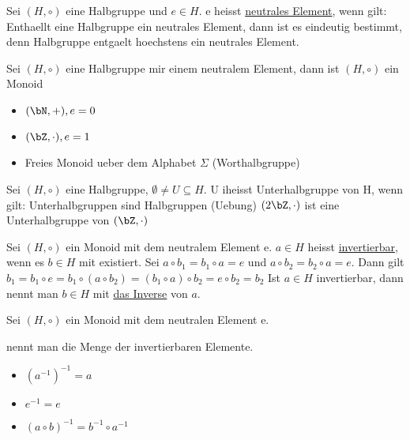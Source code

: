 Sei $(H, \circ)$ eine Halbgruppe und $e \in H$. e heisst \underline{neutrales Element},
wenn gilt:
Enthaellt eine Halbgruppe ein neutrales Element, dann ist es eindeutig bestimmt, denn
Halbgruppe entgaelt hoechstens ein neutrales Element.

Sei $(H, \circ)$ eine Halbgruppe mir einem neutralem Element, dann ist $(H, \circ)$ ein Monoid
\begin{itemize}
\item $(\bN, +), e = 0$
\item $(\bZ, \cdot) , e = 1$
\item Freies Monoid ueber dem Alphabet $\Sigma$ (Worthalbgruppe)
\end{itemize}

Sei $(H, \circ)$ eine Halbgruppe, $\emptyset \neq U \subseteq H$.
U iheisst Unterhalbgruppe von H, wenn gilt:
Unterhalbgruppen sind Halbgruppen (Uebung)
$(2\bZ, \cdot)$ ist eine Unterhalbgruppe von $(\bZ, \cdot)$

Sei $(H, \circ)$ ein Monoid mit dem neutralem Element e.
$a \in H$ heisst \underline{invertierbar}, wenn es $b \in H$ mit
existiert.
Sei $a \circ b_1 = b_1 \circ a = e$ und $a \circ b_2 = b_2 \circ a =e$. Dann gilt
$b_1 = b_1 \circ e = b_1 \circ (a \circ b_2) = (b_1 \circ a) \circ b_2 = e \circ b_2 = b_2$
Ist $a \in H$ invertierbar, dann nennt man $b \in H$ mit 
\underline{das Inverse} von $a$.

Sei $(H, \circ)$ ein Monoid mit dem neutralen Element e.

nennt man die Menge der invertierbaren Elemente.

\begin{itemize}

\item $(a^{-1})^{-1} = a$
\item $e^{-1} = e$
\item $(a \circ b)^{-1} = b^{-1} \circ a^{-1}$

\end{itemize}

